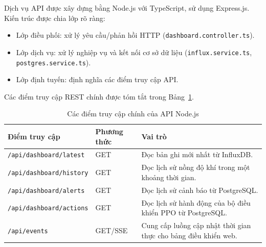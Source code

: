 Dịch vụ API được xây dựng bằng Node.js với TypeScript, sử dụng Express.js. Kiến trúc được chia lớp rõ ràng:

\begin{itemize}
  \item Lớp điều phối: xử lý yêu cầu/phản hồi HTTP (\texttt{dashboard.controller.ts}).
  \item Lớp dịch vụ: xử lý nghiệp vụ và kết nối cơ sở dữ liệu (\texttt{influx.service.ts}, \texttt{postgres.service.ts}).
  \item Lớp định tuyến: định nghĩa các điểm truy cập API.
\end{itemize}

Các điểm truy cập REST chính được tóm tắt trong Bảng~\ref{tab:backend_api}.

\begingroup
\small
\renewcommand{\arraystretch}{1.25}
\setlength{\tabcolsep}{4pt}

\begin{longtable}{
  >{\raggedright\arraybackslash}p{4.6cm}
  >{\centering\arraybackslash}p{1.7cm}
  >{\raggedright\arraybackslash}p{6.7cm}
}
\caption{Các điểm truy cập chính của API Node.js}
\label{tab:backend_api} \\
\toprule
\textbf{Điểm truy cập} 
& \textbf{Phương thức} 
& \textbf{Vai trò} \\
\midrule
\endfirsthead

\endhead

\endfoot

\bottomrule
\endlastfoot

\texttt{/api/dashboard/latest} 
& GET 
& Đọc bản ghi mới nhất từ InfluxDB. \\

\texttt{/api/dashboard/history} 
& GET 
& Đọc lịch sử nồng độ khí trong một khoảng thời gian. \\

\texttt{/api/dashboard/alerts} 
& GET 
& Đọc lịch sử cảnh báo từ PostgreSQL. \\

\texttt{/api/dashboard/actions} 
& GET 
& Đọc lịch sử hành động của bộ điều khiển PPO từ PostgreSQL. \\

\texttt{/api/events} 
& GET/SSE 
& Cung cấp luồng cập nhật thời gian thực cho bảng điều khiển web. \\

\end{longtable}
\endgroup


